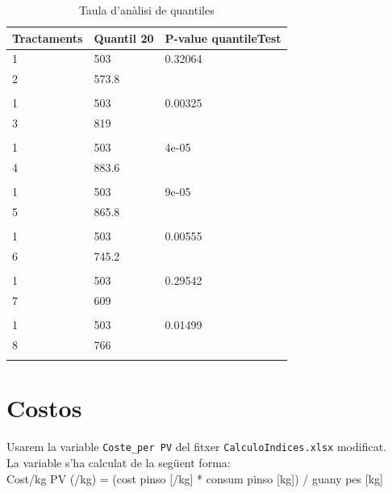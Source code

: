 \documentclass[11pt,a4paper]{article}\usepackage[]{graphicx}\usepackage[]{color}
\begin{document}
\begin{table}[ht]
\centering
\begingroup\fontsize{12pt}{12pt}\selectfont
\begin{tabular}{lll}
  \toprule
{\textbf{Tractaments}} & {\textbf{Quantil 20}} & {\textbf{P-value quantileTest}} \\ 
  \midrule
1 & 503 & 0.32064 \\ 
  2 & 573.8 &  \\ 
   &  &  \\ 
  1 & 503 & 0.00325 \\ 
  3 & 819 &  \\ 
   &  &  \\ 
  1 & 503 & 4e-05 \\ 
  4 & 883.6 &  \\ 
   &  &  \\ 
  1 & 503 & 9e-05 \\ 
  5 & 865.8 &  \\ 
   &  &  \\ 
  1 & 503 & 0.00555 \\ 
  6 & 745.2 &  \\ 
   &  &  \\ 
  1 & 503 & 0.29542 \\ 
  7 & 609 &  \\ 
   &  &  \\ 
  1 & 503 & 0.01499 \\ 
  8 & 766 &  \\ 
   &  &  \\ 
   \bottomrule
\end{tabular}
\endgroup
\caption{Taula d'anàlisi de quantiles} 
\label{tab:tot}
\end{table}


\clearpage
\section{Costos}

Usarem la variable \texttt{Coste\_per PV} del fitxer \texttt{CalculoIndices.xlsx} modificat.\\

La variable s'ha calculat de la següent forma:\\

Cost/kg PV (\EUR{}/kg) = (cost pinso [\EUR{}/kg] * consum pinso [kg]) / guany pes [kg]
\end{document}
